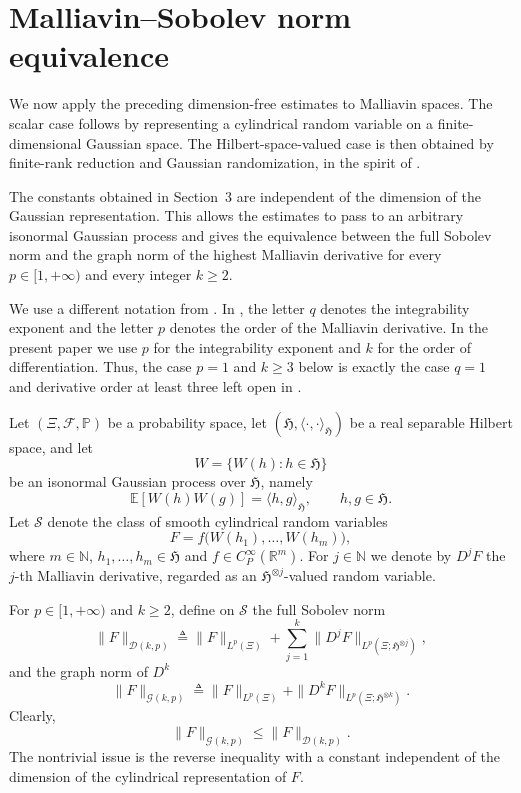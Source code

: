 \documentclass[12pt]{article}
\theoremstyle{plain}
\theoremstyle{definition}
\theoremstyle{remark}
\numberwithin{equation}{section}
\begin{document}
\section{Malliavin--Sobolev norm equivalence}
\label{sec:malliavin-L1-open-problem}

We now apply the preceding dimension-free estimates to Malliavin spaces.  The scalar case follows by representing a cylindrical random variable on a finite-dimensional Gaussian space.  The Hilbert-space-valued case is then obtained by finite-rank reduction and Gaussian randomization, in the spirit of \cite{AddonaMuratoriRossi}.

The constants obtained in Section~3 are independent of the dimension of the Gaussian representation.  This allows the estimates to pass to an arbitrary isonormal Gaussian process and gives the equivalence between the full Sobolev norm and the graph norm of the highest Malliavin derivative for every $p\in[1,+\infty)$ and every integer $k\geqslant2$.

We use a different notation from \cite{AddonaMuratoriRossi}.  In \cite{AddonaMuratoriRossi}, the letter $q$ denotes the integrability exponent and the letter $p$ denotes the order of the Malliavin derivative.  In the present paper we use $p$ for the integrability exponent and $k$ for the order of differentiation.  Thus, the case $p=1$ and $k\geqslant3$ below is exactly the case $q=1$ and derivative order at least three left open in \cite{AddonaMuratoriRossi}.



Let $(\Xi,\mathscr{F},\mathbb{P})$ be a probability space, let $(\mathfrak{H},\langle\cdot,\cdot\rangle_{\mathfrak{H}})$ be a real separable Hilbert space, and let
$$
W=\{W(h):h\in\mathfrak{H}\}
$$
be an isonormal Gaussian process over $\mathfrak{H}$, namely
$$
\mathbb{E}[W(h)W(g)]=\langle h,g\rangle_{\mathfrak{H}},\qquad h,g\in\mathfrak{H}.
$$
Let $\mathcal{S}$ denote the class of smooth cylindrical random variables
$$
F=f\bigl(W(h_{1}),\ldots,W(h_{m})\bigr),
$$
where $m\in\mathbb{N}$, $h_{1},\ldots,h_{m}\in\mathfrak{H}$ and $f\in C_{P}^{\infty}(\mathbb{R}^{m})$.  For $j\in\mathbb{N}$ we denote by $D^{j}F$ the $j$-th Malliavin derivative, regarded as an $\mathfrak{H}^{\otimes j}$-valued random variable.

For $p\in[1,+\infty)$ and $k\geqslant2$, define on $\mathcal{S}$ the full Sobolev norm
$$
\|F\|_{\mathcal{D}(k,p)}
\triangleq
\|F\|_{L^{p}(\Xi)}
+\sum_{j=1}^{k}\|D^{j}F\|_{L^{p}(\Xi;\mathfrak{H}^{\otimes j})},
$$
and the graph norm of $D^{k}$
$$
\|F\|_{\mathcal{G}(k,p)}
\triangleq
\|F\|_{L^{p}(\Xi)}
+\|D^{k}F\|_{L^{p}(\Xi;\mathfrak{H}^{\otimes k})}.
$$
Clearly,
$$
\|F\|_{\mathcal{G}(k,p)}\leqslant \|F\|_{\mathcal{D}(k,p)}.
$$
The nontrivial issue is the reverse inequality with a constant independent of the dimension of the cylindrical representation of $F$.
\end{document}
